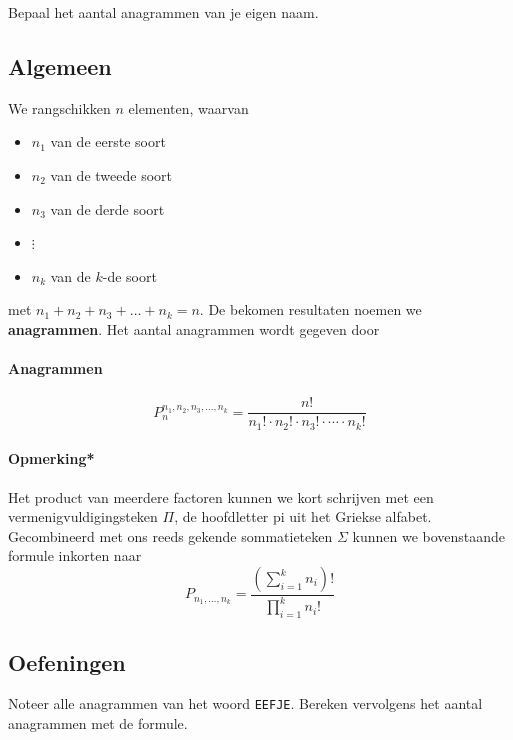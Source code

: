 \documentclass[12pt,a4,twoside]{article}
\begin{document}
\begin{oefening}
Bepaal het aantal anagrammen van je eigen naam.
\end{oefening}



\subsection{Algemeen}

We rangschikken $n$ elementen, waarvan
\begin{itemize}
  \item $n_1$ van de eerste soort
  \item $n_2$ van de tweede soort
  \item $n_3$ van de derde soort
  \item $\vdots$
  \item $n_k$ van de $k$-de soort
\end{itemize}
met $n_1+n_2+n_3+\dots+n_k=n$. De bekomen resultaten noemen we {\bf anagrammen}. Het aantal anagrammen wordt gegeven door

\paragraph*{Anagrammen}
\begin{mdframed}
$$P^{n_1,n_2,n_3,\dots,n_k}_n = \dfrac{n!}{n_1!\cdot n_2!\cdot n_3!\cdot \cdots \cdot n_k!}$$
\end{mdframed}

\paragraph*{Opmerking*}
Het product van meerdere factoren kunnen we kort schrijven met een vermenigvuldigingsteken $\Pi$, de hoofdletter pi uit het Griekse alfabet. Gecombineerd met ons reeds gekende sommatieteken $\Sigma$ kunnen we bovenstaande formule inkorten naar
\[P_{n_1,\dots,n_k} = \dfrac{\left(\sum_{i=1}^k n_i\right)!}{\prod_{i=1}^k n_i!}\]

\subsection{Oefeningen}

\vspace*{-0.5cm}
\begin{oefening}
Noteer alle anagrammen van het woord \texttt{EEFJE}. Bereken vervolgens het aantal anagrammen met de formule.
\end{oefening}
\end{document}

